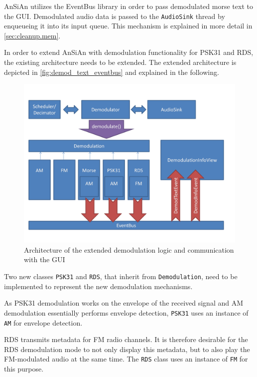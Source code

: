 \ac{AnSiAn} utilizes the EventBus library in order to pass demodulated morse text
to the \ac{GUI}. Demodulated audio data is passed to the
\texttt{AudioSink} thread by enqueueing it into its input queue.
This mechanism is explained in more detail in \autoref{sec:cleanup.mem}.


In order to extend \ac{AnSiAn} with demodulation functionality for \ac{PSK31} and \ac{RDS}, 
the existing architecture needs to be extended. The extended architecture is
depicted in \autoref{fig:demod_text_eventbus} and explained in the following.

\begin{figure}
	\centering
	\includegraphics[width=1\linewidth]{gfx/demod_text_eventbus.png}
	\caption{Architecture of the extended demodulation logic and communication with the GUI}
	\label{fig:demod_text_eventbus}
\end{figure}

Two new classes \texttt{PSK31} and \texttt{RDS}, that inherit from
\texttt{Demodulation}, need to be implemented to represent the new demodulation 
mechanisms.

As \ac{PSK31} demodulation works on the envelope of the received signal
and \ac{AM} demodulation essentially performs envelope detection, \texttt{PSK31}
uses an instance of \texttt{AM} for envelope detection.

\ac{RDS} transmits metadata for \ac{FM} radio channels. It is therefore desirable for the 
\ac{RDS} demodulation mode to not only display this metadata, but to also play the 
\ac{FM}-modulated audio at the same time. The \texttt{RDS} class uses an
instance of \texttt{FM} for this purpose.

